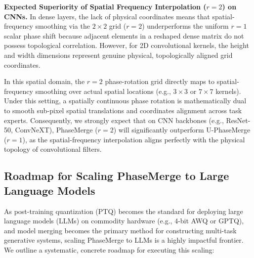 \documentclass{article}
\theoremstyle{plain}
\theoremstyle{definition}
\theoremstyle{remark}
\begin{document}
\textbf{Expected Superiority of Spatial Frequency Interpolation ($r=2$) on CNNs.} 
In dense layers, the lack of physical coordinates means that spatial-frequency smoothing via the $2 \times 2$ grid ($r=2$) underperforms the uniform $r=1$ scalar phase shift because adjacent elements in a reshaped dense matrix do not possess topological correlation. However, for 2D convolutional kernels, the height and width dimensions represent genuine physical, topologically aligned grid coordinates. 

In this spatial domain, the $r=2$ phase-rotation grid directly maps to spatial-frequency smoothing over actual spatial locations (e.g., $3 \times 3$ or $7 \times 7$ kernels). Under this setting, a spatially continuous phase rotation is mathematically dual to smooth sub-pixel spatial translations and coordinates alignment across task experts. Consequently, we strongly expect that on CNN backbones (e.g., ResNet-50, ConvNeXT), PhaseMerge ($r=2$) will significantly outperform U-PhaseMerge ($r=1$), as the spatial-frequency interpolation aligns perfectly with the physical topology of convolutional filters.

\subsection{Roadmap for Scaling PhaseMerge to Large Language Models}
\label{sec:app_llm_scaling}

As post-training quantization (PTQ) becomes the standard for deploying large language models (LLMs) on commodity hardware (e.g., 4-bit AWQ or GPTQ), and model merging becomes the primary method for constructing multi-task generative systems, scaling PhaseMerge to LLMs is a highly impactful frontier. We outline a systematic, concrete roadmap for executing this scaling:
\end{document}
